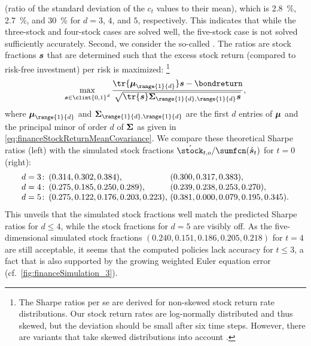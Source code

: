 (ratio of the standard deviation of the $c_t$ values to their mean),
which is \SI{2.8}{\percent}, \SI{2.7}{\percent}, and \SI{30}{\percent}
for $d = 3$, $4$, and $5$, respectively.
This indicates that while the three-stock and four-stock cases are
solved well, the five-stock case is not solved sufficiently accurately.
Second, we consider the so-called 
\cite{Sharpe66Mutual}.
The ratios are stock fractions ${\boldsymbol{s}}$ that are determined
such that the excess stock return (compared to risk-free investment)
per risk is maximized:%
\footnote{%
  The Sharpe ratios per se are derived for non-skewed
  stock return rate distributions.
  Our stock return rates are log-normally distributed and thus skewed,
  but the deviation should be small after six time steps.
  However, there are variants that
  take skewed distributions into account \cite{Mueller15Ansaetze}.%
}
{%
  \setlength{\abovedisplayskip}{9pt}%
  \setlength{\belowdisplayskip}{9pt}%
  \begin{equation}
    \max_{\vstock \in \clint{0, 1}^d}
    \frac{
      \tr{\*\mu_{\range{1}{d}}} \vstock - \bondreturn
    }{
      \sqrt{\tr{\vstock} \mat{\Sigma}_{\range{1}{d},\range{1}{d}} \vstock}
    },
  \end{equation}%
}%
where $\*\mu_{\range{1}{d}}$ and
$\mat{\Sigma}_{\range{1}{d},\range{1}{d}}$
are the first $d$ entries of ${\boldsymbol{\mu}}$ and
the principal minor of order $d$ of ${\boldsymbol{\Sigma}}$ as given in
\cref{eq:financeStockReturnMeanCovariance}.
We compare these theoretical Sharpe ratios (left)
with the simulated stock fractions
$\acute{\stock}_{t,o}/\sumfcn(\acute{\vstock}_t)$ for $t = 0$ (right):
\begin{subequations}
  \setlength{\jot}{0pt}%
  \setlength{\abovedisplayskip}{9pt}%
  \setlength{\belowdisplayskip}{9pt}%
  \begin{align}
    d = 3\colon\,&
    (0.314, 0.302, 0.384\rlap{),}\hphantom{, 0.999, 0.999}\quad
    (0.300, 0.317, 0.383),\\
    d = 4\colon\,&
    (0.275, 0.185, 0.250, 0.289\rlap{),}\hphantom{, 0.999}\quad
    (0.239, 0.238, 0.253, 0.270),\\
    d = 5\colon\,&
    (0.275, 0.122, 0.176, 0.203, 0.223\rlap{),}\quad
    (0.381, 0.000, 0.079, 0.195, 0.345).
  \end{align}
\end{subequations}
This unveils that the simulated stock fractions
well match the predicted Sharpe ratios for $d \le 4$,
while the stock fractions for $d = 5$ are visibly off.
As the five-dimensional simulated stock fractions
$(0.240, 0.151, 0.186, 0.205, 0.218)$
for $t = 4$ are still acceptable,
it seems that the computed policies lack accuracy for $t \le 3$,
a fact that is also supported by the growing
weighted Euler equation error (cf.\ \cref{fig:financeSimulation_3}).

